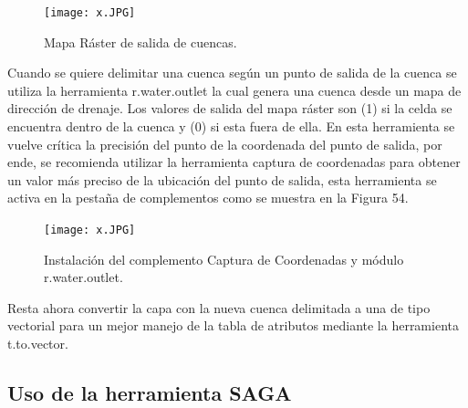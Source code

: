 \documentclass[12pt,hidelinks]{article}
\begin{document}
\begin{figure}[H]
    \centering
    \texttt{[image: x.JPG]}
    \caption{   Mapa Ráster de salida de cuencas.}
 \label{fig:my_label}
\end{figure}
Cuando se quiere delimitar una cuenca según un punto de salida de la cuenca se utiliza la herramienta r.water.outlet la cual genera una cuenca desde un mapa de dirección de drenaje. Los valores de salida del mapa ráster son (1) si la celda se encuentra dentro de la cuenca y (0) si esta fuera de ella. En esta herramienta se vuelve crítica la precisión del punto de la coordenada del punto de salida, por ende, se recomienda utilizar la herramienta captura de coordenadas para obtener un valor más preciso de la ubicación del punto de salida, esta herramienta se activa en la pestaña de complementos como se muestra en la Figura 54.
\begin{figure}[H]
    \centering
    \texttt{[image: x.JPG]}
    \caption{ Instalación del complemento Captura de Coordenadas y módulo r.water.outlet.  }
 \label{fig:my_label}
\end{figure}
Resta ahora convertir la capa con la nueva cuenca delimitada a una de tipo vectorial para un mejor manejo de la tabla de atributos mediante la herramienta t.to.vector.

\subsection{Uso de la herramienta SAGA}
\end{document}
